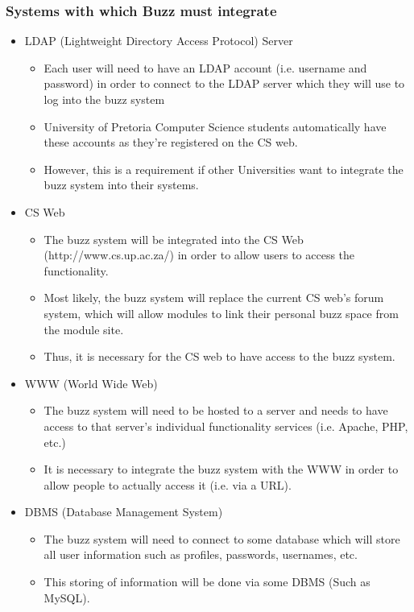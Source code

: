 \documentclass[11pt]{article}
\begin{document}
	\subsubsection{Systems with which Buzz must integrate}
	\begin{itemize}
	\item LDAP (Lightweight Directory Access Protocol) Server
		\begin{itemize}
			\item Each user will need to have an LDAP account (i.e. username and password) in order to connect to the LDAP server which they will use to log into the buzz system
			\item University of Pretoria Computer Science students automatically have these accounts as they’re registered on the CS web.
			\item However, this is a requirement if other Universities want to integrate the buzz system into their systems.
		\end{itemize}
	
	\item CS Web
		\begin{itemize}
			\item The buzz system will be integrated into the CS Web (http://www.cs.up.ac.za/) in order to allow users to access the functionality. 
			\item Most likely, the buzz system will replace the current CS web’s forum system, which will allow modules to link their personal buzz space from the module site.
			\item Thus, it is necessary for the CS web to have access to the buzz system.
		\end{itemize}
	\item WWW (World Wide Web)
		\begin{itemize}
			\item The buzz system will need to be hosted to a server and needs to have access to that server’s individual functionality services (i.e. Apache, PHP, etc.)
			\item It is necessary to integrate the buzz system with the WWW in order to allow people to actually access it (i.e. via a URL).
		\end{itemize}
	\item DBMS (Database Management System)
		\begin{itemize}
			\item The buzz system will need to connect to some database which will store all user information such as profiles, passwords, usernames, etc. 
			\item This storing of information will be done via some DBMS (Such as MySQL).
		\end{itemize}
	\end{itemize}
	
\end{document}
